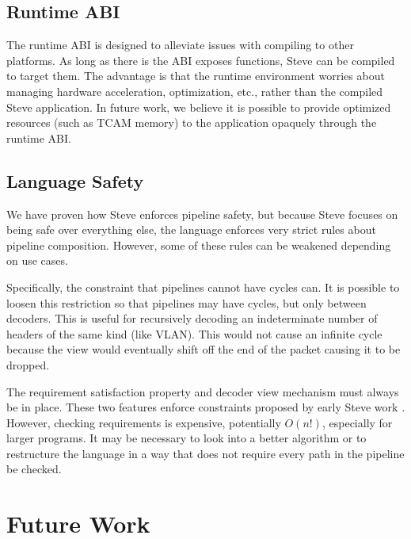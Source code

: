 \subsection{Runtime ABI}

The runtime ABI is designed to alleviate issues with compiling to other platforms.
As long as there is the ABI exposes functions, Steve can be compiled to target them. The advantage is that the runtime environment worries about managing hardware acceleration, optimization, etc., rather than the compiled Steve application. In future work, we believe it is possible to provide optimized resources (such as TCAM memory) to the application opaquely through the runtime ABI.

\subsection{Language Safety}

We have proven how Steve enforces pipeline safety, but
because Steve focuses on being safe over everything else, the language enforces very strict rules about pipeline composition. However, some of these rules can be weakened depending on use cases.

Specifically, the constraint that pipelines cannot have cycles can. It is possible to loosen this restriction so that pipelines may have cycles, but only between decoders. This is useful for recursively decoding an indeterminate number of headers of the same kind (like VLAN). This would not cause an infinite cycle because the view would eventually shift off the end of the packet causing it to be dropped.

The requirement satisfaction property and decoder view mechanism must always be in place. These two features enforce constraints proposed by early Steve work \cite{wripe}. However, checking requirements is expensive, potentially $O(n!)$, especially for larger programs. It may be necessary to look into a better algorithm or to restructure the language in a way that does not require every path in the pipeline be checked.

%

\section{Future Work}

